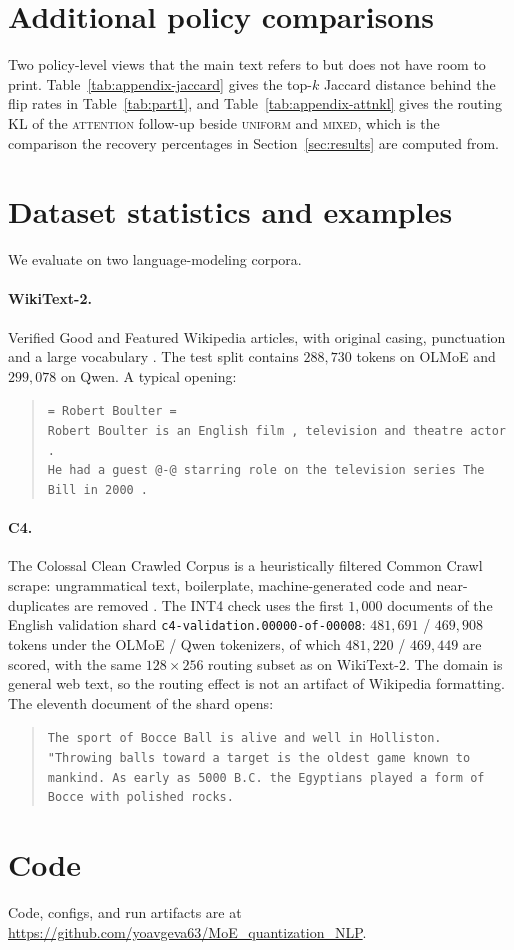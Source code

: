 \documentclass[11pt]{article}
\newcommand{\uniform}{\textsc{uniform}}
\newcommand{\mixed}{\textsc{mixed}}
\newcommand{\attn}{\textsc{attention}}
\begin{document}
\section{Additional policy comparisons}
\label{sec:appendix-part1}

Two policy-level views that the main text refers to but does not have room
to print. Table~\ref{tab:appendix-jaccard} gives the top-$k$ Jaccard
distance behind the flip rates in Table~\ref{tab:part1}, and
Table~\ref{tab:appendix-attnkl} gives the routing KL of the \attn{}
follow-up beside \uniform{} and \mixed{}, which is the comparison the
recovery percentages in Section~\ref{sec:results} are computed from.

\section{Dataset statistics and examples}
\label{sec:appendix-data}

We evaluate on two language-modeling corpora.

\paragraph{WikiText-2.}
Verified Good and Featured Wikipedia articles, with original casing,
punctuation and a large vocabulary \citep{merity2017pointer}. The test
split contains $288{,}730$ tokens on OLMoE and $299{,}078$ on Qwen. A
typical opening:
\begin{quote}
\small
\begin{minipage}{\linewidth}
\texttt{= Robert Boulter =}\\
\texttt{Robert Boulter is an English film , television and theatre actor .}\\
\texttt{He had a guest @-@ starring role on the television series The Bill in 2000 .}
\end{minipage}
\end{quote}

\paragraph{C4.}
The Colossal Clean Crawled Corpus is a heuristically filtered Common Crawl
scrape: ungrammatical text, boilerplate, machine-generated code and
near-duplicates are removed \citep{raffel2020t5}. The INT4 check uses the
first $1{,}000$ documents of the English validation shard
\texttt{c4-validation.00000-of-00008}: $481{,}691$ / $469{,}908$ tokens
under the OLMoE / Qwen tokenizers, of which $481{,}220$ / $469{,}449$ are
scored, with the same $128\times256$ routing subset as on WikiText-2. The
domain is general web text, so the routing effect is not an artifact of
Wikipedia formatting. The eleventh document of the shard opens:
\begin{quote}
\small
\begin{minipage}{\linewidth}
\texttt{The sport of Bocce Ball is alive and well in Holliston.}\\
\texttt{"Throwing balls toward a target is the oldest game known to mankind.
As early as 5000 B.C. the Egyptians played a form of Bocce with polished
rocks.}
\end{minipage}
\end{quote}

\section{Code}
\label{sec:appendix-code}
Code, configs, and run artifacts are at
\url{https://github.com/yoavgeva63/MoE_quantization_NLP}.
\end{document}
